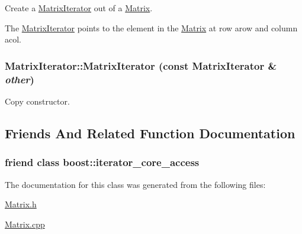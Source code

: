 Create a \hyperlink{class_matrix_iterator}{MatrixIterator} out of a \hyperlink{class_matrix}{Matrix}. 

The \hyperlink{class_matrix_iterator}{MatrixIterator} points to the element in the \hyperlink{class_matrix}{Matrix} at row arow and column acol. \hypertarget{class_matrix_iterator_ad76738f7e6933d090a2fe9632e02441c}{
\subsubsection[{MatrixIterator}]{\setlength{\rightskip}{0pt plus 5cm}MatrixIterator::MatrixIterator (const {\bf MatrixIterator} \& {\em other})}}
\label{class_matrix_iterator_ad76738f7e6933d090a2fe9632e02441c}


Copy constructor. 



\subsection{Friends And Related Function Documentation}
\hypertarget{class_matrix_iterator_ac09f73e325921cc50ebcd96bed0f8096}{
\subsubsection[{boost::iterator\_\-core\_\-access}]{\setlength{\rightskip}{0pt plus 5cm}friend class boost::iterator\_\-core\_\-access}}
\label{class_matrix_iterator_ac09f73e325921cc50ebcd96bed0f8096}


The documentation for this class was generated from the following files:\begin{DoxyCompactItemize}
\item 
\hyperlink{_matrix_8h}{Matrix.h}\item 
\hyperlink{_matrix_8cpp}{Matrix.cpp}\end{DoxyCompactItemize}
